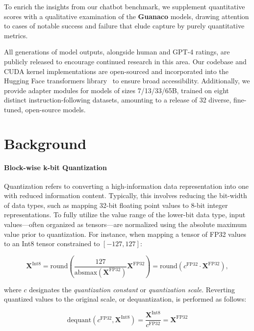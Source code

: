 To enrich the insights from our chatbot benchmark, we supplement quantitative scores with a qualitative examination of the \textbf{Guanaco} models, drawing attention to cases of notable success and failure that elude capture by purely quantitative metrics.

All generations of model outputs, alongside human and GPT-4 ratings, are publicly released to encourage continued research in this area. Our codebase and CUDA kernel implementations are open-sourced and incorporated into the Hugging Face transformers library~\citep{wolf2019huggingface} to ensure broad accessibility. Additionally, we provide adapter modules for models of sizes 7/13/33/65B, trained on eight distinct instruction-following datasets, amounting to a release of 32 diverse, fine-tuned, open-source models.

\section{Background}
\paragraph{Block-wise k-bit Quantization} Quantization refers to converting a high-information data representation into one with reduced information content. Typically, this involves reducing the bit-width of data types, such as mapping 32-bit floating point values to 8-bit integer representations. To fully utilize the value range of the lower-bit data type, input values—often organized as tensors—are normalized using the absolute maximum value prior to quantization. For instance, when mapping a tensor of FP32 values to an Int8 tensor constrained to $[-127, 127]$:

\begin{equation}
    \mathbf{X}^{ \text{Int8}} = \text{round}\left( \frac{127}{{\text{absmax}}(\mathbf{X}^{{\text{FP32}}})}\mathbf{X}^{{\text{FP32}}} \right) = \text{round}(c^{\text{FP32}}\cdot \mathbf{X}^{{\text{FP32}}}),
\end{equation}

where $c$ designates the {\em quantization constant} or {\em quantization scale}. Reverting quantized values to the original scale, or dequantization, is performed as follows:

\begin{equation}
    \text{dequant}(c^{\text{FP32}}, \mathbf{X}^{\text{Int8}}) = \frac{\mathbf{X}^{\text{Int8}}}{c^{\text{FP32}}} = \mathbf{X}^{\text{FP32}}
\end{equation}

